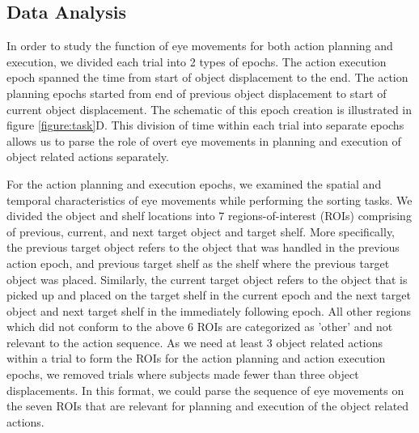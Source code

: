 \subsection{Data Analysis}\label{sec:data_analysis}

In order to study the function of eye movements for both action planning and execution, we divided each trial into 2 types of epochs. The action execution epoch spanned the time from start of object displacement to the end. The action planning epochs started from end of previous object displacement to start of current object displacement. The schematic of this epoch creation is illustrated in figure \ref{figure:task}D. This division of time within each trial into separate epochs allows us to parse the role of overt eye movements in planning and execution of object related actions separately.

For the action planning and execution epochs, we examined the spatial and temporal characteristics of eye movements while performing the sorting tasks. We divided the object and shelf locations into 7 regions-of-interest (ROIs) comprising of previous, current, and next target object and target shelf. More specifically, the previous target object refers to the object that was handled in the previous action epoch, and previous target shelf as the shelf where the previous target object was placed. Similarly, the current target object refers to the object that is picked up and placed on the target shelf in the current epoch and the next target object and next target shelf in the immediately following epoch. All other regions which did not conform to the above 6 ROIs are categorized as 'other' and not relevant to the action sequence.  As we need at least 3 object related actions within a trial to form the ROIs for the action planning and action execution epochs, we removed trials where subjects made fewer than three object displacements. In this format, we could parse the sequence of eye movements on the seven ROIs that are relevant for planning and execution of the object related actions. 




